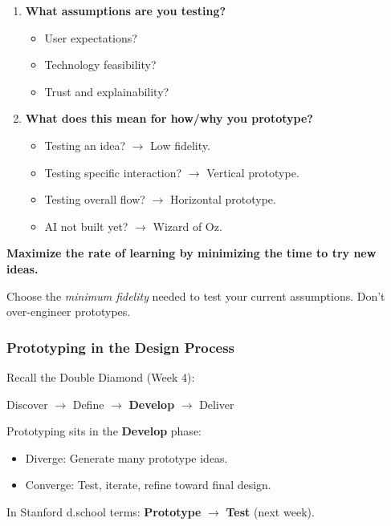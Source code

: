 \begin{enumerate}
  \item \textbf{What assumptions are you testing?}
  \begin{itemize}
    \item User expectations?
    \item Technology feasibility?
    \item Trust and explainability?
  \end{itemize}
  
  \item \textbf{What does this mean for how/why you prototype?}
  \begin{itemize}
    \item Testing an idea? $\to$ Low fidelity.
    \item Testing specific interaction? $\to$ Vertical prototype.
    \item Testing overall flow? $\to$ Horizontal prototype.
    \item AI not built yet? $\to$ Wizard of Oz.
  \end{itemize}
\end{enumerate}

\begin{tipbox}
\textbf{Maximize the rate of learning by minimizing the time to try new ideas.}

Choose the \textit{minimum fidelity} needed to test your current assumptions. Don't over-engineer prototypes.
\end{tipbox}

\subsubsection*{Prototyping in the Design Process}

Recall the Double Diamond (Week 4):
\begin{center}
Discover $\to$ Define $\to$ \textbf{Develop} $\to$ Deliver
\end{center}

Prototyping sits in the \textbf{Develop} phase:
\begin{itemize}
  \item Diverge: Generate many prototype ideas.
  \item Converge: Test, iterate, refine toward final design.
\end{itemize}

In Stanford d.school terms: \textbf{Prototype} $\to$ \textbf{Test} (next week).

